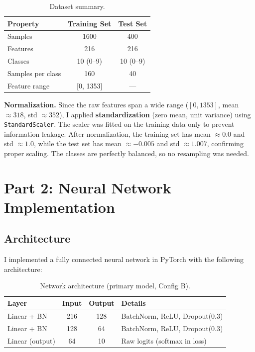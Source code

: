 \documentclass[11pt]{article}
\begin{document}
\begin{table}[H]
	\centering
	\caption{Dataset summary.}
	\begin{tabular}{lcc}
		\toprule
		Property          & Training Set & Test Set  \\
		\midrule
		Samples           & 1600         & 400       \\
		Features          & 216          & 216       \\
		Classes           & 10 (0--9)    & 10 (0--9) \\
		Samples per class & 160          & 40        \\
		Feature range     & [0, 1353]    & ---       \\
		\bottomrule
	\end{tabular}
	\label{tab:data_summary}
\end{table}

\textbf{Normalization.} Since the raw features span a wide range ($[0, 1353]$, mean $\approx 318$, std $\approx 352$), I applied \textbf{standardization} (zero mean, unit variance) using \texttt{StandardScaler}. The scaler was fitted on the training data only to prevent information leakage. After normalization, the training set has mean $\approx 0.0$ and std $\approx 1.0$, while the test set has mean $\approx -0.005$ and std $\approx 1.007$, confirming proper scaling. The classes are perfectly balanced, so no resampling was needed.

\section{Part 2: Neural Network Implementation}

\subsection{Architecture}
I implemented a fully connected neural network in PyTorch with the following architecture:

\begin{table}[H]
	\centering
	\caption{Network architecture (primary model, Config B).}
	\begin{tabular}{lccl}
		\toprule
		Layer           & Input & Output & Details                       \\
		\midrule
		Linear + BN     & 216   & 128    & BatchNorm, ReLU, Dropout(0.3) \\
		Linear + BN     & 128   & 64     & BatchNorm, ReLU, Dropout(0.3) \\
		Linear (output) & 64    & 10     & Raw logits (softmax in loss)  \\
		\bottomrule
	\end{tabular}
	\label{tab:architecture}
\end{table}
\end{document}
